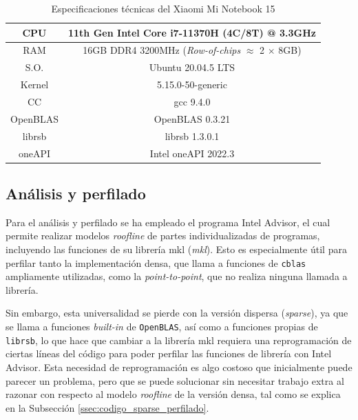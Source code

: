 \begin{table}[htpb]
\centering
\begin{tabular}{|c|c|}
    \hline
    CPU & 11th Gen Intel Core i7-11370H (4C/8T) @ 3.3GHz\\\hline
    RAM & 16GB DDR4 3200MHz (\textit{Row-of-chips} {\small$\approx$} 2 $\times$ 8GB)\\\hline
    S.O. & Ubuntu 20.04.5 LTS\\\hline
    Kernel & 5.15.0-50-generic \\\hline
    CC & gcc 9.4.0\\\hline
    OpenBLAS & OpenBLAS 0.3.21\\\hline
    librsb & librsb 1.3.0.1\\\hline
    oneAPI & Intel oneAPI 2022.3\\\hline
\end{tabular}
\caption{\label{tb:especificaciones_xiaomi}Especificaciones técnicas del Xiaomi Mi Notebook 15}
\end{table}

\subsection{Análisis y perfilado}
\label{ssec:analisis_perfilado_metodologia}
Para el análisis y perfilado se ha empleado el programa Intel Advisor, el cual permite realizar modelos \textit{roofline} de partes individualizadas de programas, incluyendo las funciones de su librería \acrshort{mkl} (\textit{\acrlong{mkl}}). Esto es especialmente útil para perfilar tanto la implementación densa, que llama a funciones de \texttt{cblas} ampliamente utilizadas, como la \textit{point-to-point}, que no realiza ninguna llamada a librería.

Sin embargo, esta universalidad se pierde con la versión dispersa (\textit{sparse}), ya que se llama a funciones \textit{built-in} de \texttt{OpenBLAS}, así como a funciones propias de \texttt{librsb}, lo que hace que cambiar a la librería \acrshort{mkl} requiera una reprogramación de ciertas líneas del código para poder perfilar las funciones de librería con Intel Advisor. Esta necesidad de reprogramación es algo costoso que inicialmente puede parecer un problema, pero que se puede solucionar sin necesitar trabajo extra al razonar con respecto al modelo \textit{roofline} de la versión densa, tal como se explica en la Subsección \ref{ssec:codigo_sparse_perfilado}.

